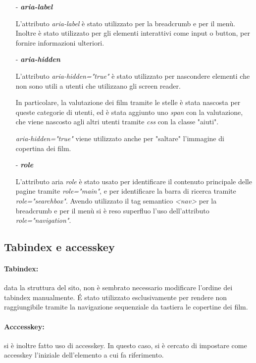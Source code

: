 \documentclass[a4paper]{article}
\begin{document}
\begin{itemize}
    \item [-] \textit{\textbf{aria-label}}
    
    L'attributo \textit{aria-label} è stato utilizzato per la breadcrumb e per il menù.
    Inoltre è stato utilizzato per gli elementi interattivi come input o button, per fornire informazioni ulteriori.

    \item [-] \textit{\textbf{aria-hidden}}
    
    L'attributo \textit{aria-hidden="true"} è stato utilizzato per nascondere elementi che non sono utili a utenti che utilizzano gli screen reader.

    In particolare, la valutazione dei film tramite le stelle è stata nascosta per queste categorie di utenti, ed è stata aggiunto uno \textit{span} con la valutazione, che viene nascosto agli altri utenti tramite \textit{css} con la classe "aiuti".

    \textit{aria-hidden="true"} viene utilizzato anche per "saltare" l'immagine di copertina dei film.

    \item [-] \textit{\textbf{role}}
    
    L'attributo aria \textit{role} è stato usato per identificare il contenuto principale delle pagine tramite \textit{role="main"}, e per identificare la barra di ricerca tramite \textit{role="searchbox"}.
    Avendo utilizzato il tag semantico \textit{<nav>} per la breadcrumb e per il menù si è reso superfluo l'uso dell'attributo \textit{role="navigation"}.

\end{itemize}

\subsection{Tabindex e accesskey}

\paragraph*{Tabindex:}
data la struttura del sito, non è sembrato necessario modificare l’ordine dei tabindex manualmente.
É stato utilizzato esclusivamente per rendere non raggiungibile tramite la navigazione sequenziale da tastiera le copertine dei film.

\paragraph*{Acccesskey:}
si è inoltre fatto uso di accesskey. In questo caso, si è cercato di impostare come accesskey l'iniziale dell'elemento a cui fa riferimento.
\end{document}
